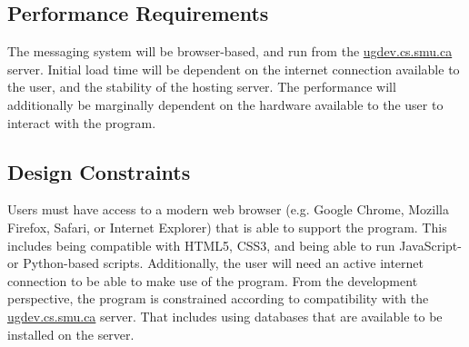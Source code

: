\documentclass[11pt]{article}
\begin{document}
\subsection{Performance Requirements}
The messaging system will be browser-based, and run from the \url{ugdev.cs.smu.ca} server. Initial
load time will be dependent on the internet connection available to the user, and the stability of
the hosting server. The performance will additionally be marginally dependent on the hardware
available to the user to interact with the program.

\subsection{Design Constraints}
Users must have access to a modern web browser (e.g. Google Chrome, Mozilla Firefox, Safari, or
Internet Explorer) that is able to support the program. This includes being compatible with HTML5,
CSS3, and being able to run JavaScript- or Python-based scripts. Additionally, the user will need an
active internet connection to be able to make use of the program. From the development perspective,
the program is constrained according to compatibility with the \url{ugdev.cs.smu.ca} server. That
includes using databases that are available to be installed on the server.
\end{document}
